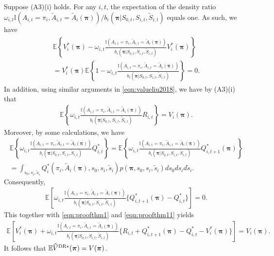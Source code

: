 \documentclass{article}
\newcommand{\Mean}{{\mathbb{E}}}
\begin{document}
Suppose (A3)(i) holds. For any $i,t$, the expectation of the density ratio $\omega_{i,t}\mathbb{I}(A_{i,t}=\pi_i,\widetilde{A}_{i,t}=\widetilde{A}_i(\bm{\pi}))/b_i(\bm{\pi}|S_{0,t},S_{i,t},\widetilde{S}_{i,t})$ equals one. As such, we have
\begin{eqnarray}\label{eqn:proofthm1}
\begin{split}
	\Mean \left\{V_i^*(\bm{\pi})- \omega_{i,t}\frac{\mathbb{I}(A_{i,t}=\pi_i,\widetilde{A}_{i,t}=\widetilde{A}_i(\bm{\pi}))}{b_i(\bm{\pi}|S_{0,t},S_{i,t},\widetilde{S}_{i,t})}V_i^*(\bm{\pi})\right\}\\
	=V_i^*(\bm{\pi}) \Mean \left\{1- \omega_{i,t}\frac{\mathbb{I}(A_{i,t}=\pi_i,\widetilde{A}_{i,t}=\widetilde{A}_i(\bm{\pi}))}{b_i(\bm{\pi}|S_{0,t},S_{i,t},\widetilde{S}_{i,t})} \right\}=0.
\end{split}	
\end{eqnarray}
In addition, using similar arguments in \eqref{eqn:valueliu2018}, we have by (A3)(i) that 
\begin{eqnarray}\label{eqn:proofthm11}
	\Mean \left\{\omega_{i,t}\frac{\mathbb{I}(A_{i,t}=\pi_i,\widetilde{A}_{i,t}=\widetilde{A}_i(\bm{\pi}))}{b_i(\bm{\pi}|S_{0,t},S_{i,t},\widetilde{S}_{i,t})}
	R_{i,t}\right\}=V_i(\bm{\pi}).
\end{eqnarray}
Moreover, by some calculations, we have
\begin{eqnarray*}
	\Mean \left\{\omega_{i,t}\frac{\mathbb{I}(A_{i,t}=\pi_i,\widetilde{A}_{i,t}=\widetilde{A}_i(\bm{\pi}))}{b_i(\bm{\pi}|S_{0,t},S_{i,t},\widetilde{S}_{i,t})}Q_{i,t}^*\right\}=\Mean \left\{  \omega_{i,t}\frac{\mathbb{I}(A_{i,t}=\pi_i,\widetilde{A}_{i,t}=\widetilde{A}_i(\bm{\pi}))}{b_i(\bm{\pi}|S_{0,t},S_{i,t},\widetilde{S}_{i,t})}Q_{i,t+1}^*(\bm{\pi})\right\}\\
	=\int_{s_0,s_i,\tilde{s}_i} Q_i^*(\pi_i,\widetilde{A}_i(\bm{\pi}),s_0,s_i,\tilde{s}_i)p(\bm{\pi},s_0,s_i,\tilde{s}_i)ds_0ds_id\tilde{s}_i.
\end{eqnarray*}
Consequently,
\begin{eqnarray*}
	\Mean \left[\omega_{i,t}\frac{\mathbb{I}(A_{i,t}=\pi_i,\widetilde{A}_{i,t}=\widetilde{A}_i(\bm{\pi}))}{b_i(\bm{\pi}|S_{0,t},S_{i,t},\widetilde{S}_{i,t})}\{Q_{i,t+1}^*(\bm{\pi})-Q_{i,t}^*\}\right]=0.
\end{eqnarray*}
This together with \eqref{eqn:proofthm1} and \eqref{eqn:proofthm11} yields 
\begin{eqnarray*}
	\Mean \left[V_i^*(\bm{\pi})+ \omega_{i,t}\frac{\mathbb{I}(A_{i,t}=\pi_i,\widetilde{A}_{i,t}=\widetilde{A}_i(\bm{\pi}))}{b_i(\bm{\pi}|S_{0,t},S_{i,t},\widetilde{S}_{i,t})}
	\{R_{i,t}+Q_{i,t+1}^*(\bm{\pi})-Q_{i,t}^*-V_i^*(\bm{\pi})\}\right]=V_i(\bm{\pi}). 
\end{eqnarray*}
It follows that $\Mean \widehat{V}^{\hbox{\scriptsize{DR}}*}(\bm{\pi})=V(\bm{\pi})$. 
\end{document}
